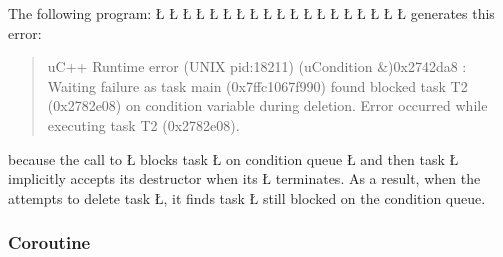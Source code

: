 \documentclass[openright,twoside]{report}
\begin{document}
The following program:
\LGinlinefalse\LGbegin\lgrinde
\L{}
\L{\LB{}}
\L{}
\L{\LB{}}
\L{}
\L{\LB{}}
\L{\LB{\};}}
\endlgrinde\LGend
\LGinlinefalse\LGbegin\lgrinde
\L{}
\L{\LB{}}
\L{\LB{}}
\L{}
\L{\LB{}}
\L{\LB{\};}}
\endlgrinde\LGend
\LGinlinefalse\LGbegin\lgrinde
\L{}
\L{\LB{}}
\L{\LB{}}
\L{\LB{}}
\L{\LB{}}
\L{\LB{\}}}
\endlgrinde\LGend
generates this error:
\begin{quote}
\BGfont
uC++ Runtime error (UNIX pid:18211) (uCondition \&)0x2742da8 : Waiting failure as task main (0x7ffc1067f990) found blocked task T2 (0x2782e08) on condition variable during deletion.
Error occurred while executing task T2 (0x2782e08).
\end{quote}
because the call to \LGinlinetrue\LGbegin\lgrinde\L{}\endlgrinde\LGend{} blocks task \LGinlinetrue\LGbegin\lgrinde\L{}\endlgrinde\LGend{} on condition queue \LGinlinetrue\LGbegin\lgrinde\L{}\endlgrinde\LGend{} and then task \LGinlinetrue\LGbegin\lgrinde\L{}\endlgrinde\LGend{} implicitly accepts its destructor when its \LGinlinetrue\LGbegin\lgrinde\L{}\endlgrinde\LGend{} terminates.
As a result, when the  attempts to delete task \LGinlinetrue\LGbegin\lgrinde\L{}\endlgrinde\LGend{}, it finds task \LGinlinetrue\LGbegin\lgrinde\L{}\endlgrinde\LGend{} still blocked on the condition queue.


\subsubsection{Coroutine}
\end{document}
